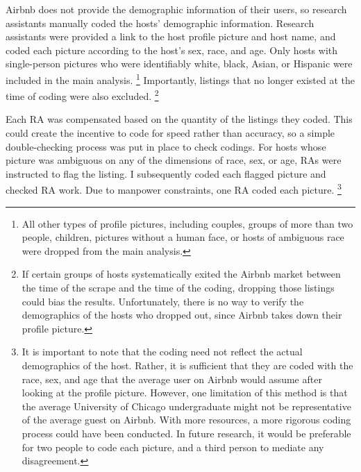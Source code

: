 Airbnb does not provide the demographic information of their users, so research assistants manually coded the hosts' demographic information. Research assistants were provided a link to the host profile picture and host name, and coded each picture according to the host's sex, race, and age. Only hosts with single-person pictures who were identifiably white, black, Asian, or Hispanic were included in the main analysis.%
	\footnote{All other types of profile pictures, including couples, groups of more than two people, children, pictures without a human face, or hosts of ambiguous race were dropped from the main analysis.}
Importantly, listings that no longer existed at the time of coding were also excluded.%
	\footnote{If certain groups of hosts systematically exited the Airbnb market between the time of the scrape and the time of the coding, dropping those listings could bias the results. Unfortunately, there is no way to verify the demographics of the hosts who dropped out, since Airbnb takes down their profile picture.}

Each RA was compensated based on the quantity of the listings they coded. This could create the incentive to code for speed rather than accuracy, so a simple double-checking process was put in place to check codings. For hosts whose picture was ambiguous on any of the dimensions of race, sex, or age, RAs were instructed to flag the listing. I subsequently coded each flagged picture and checked RA work. Due to manpower constraints, one RA coded each picture.%
	\footnote{It is important to note that the coding need not reflect the actual demographics of the host. Rather, it is sufficient that they are coded with the race, sex, and age that the average user on Airbnb would assume after looking at the profile picture. However, one limitation of this method is that the average University of Chicago undergraduate might not be representative of the average guest on Airbnb. With more resources, a more rigorous coding process could have been conducted. In future research, it would be preferable for two people to code each picture, and a third person to mediate any disagreement.}

